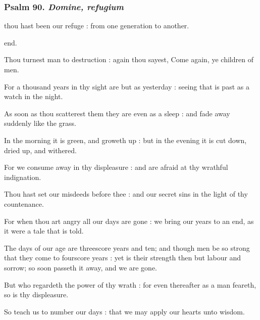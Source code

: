 \subsubsection{Psalm 90. \textit{Domine, refugium}}
 thou hast been our refuge : from one generation to another.\par
\noindent
end.\par
{}Thou turnest man to destruction : again thou sayest, Come again, ye children of men.\par
{}For a thousand years in thy sight are but as yesterday : seeing that is past as a watch in the night.\par
{}As soon as thou scatterest them they are even as a sleep : and fade away suddenly like the grass.\par
{}In the morning it is green, and groweth up : but in the evening it is cut down, dried up, and withered.\par
{}For we consume away in thy displeasure : and are afraid at thy wrathful indignation.\par
{}Thou hast set our misdeeds before thee : and our secret sins in the light of thy countenance.\par
{}For when thou art angry all our days are gone : we bring our years to an end, as it were a tale that is told.\par
{}The days of our age are threescore years and ten; and though men be so strong that they come to fourscore years : yet is their strength then but labour and sorrow; so soon passeth it away, and we are gone.\par
{}But who regardeth the power of thy wrath : for even thereafter as a man feareth, so is thy displeasure.\par
{}So teach us to number our days : that we may apply our hearts unto wisdom.\par

